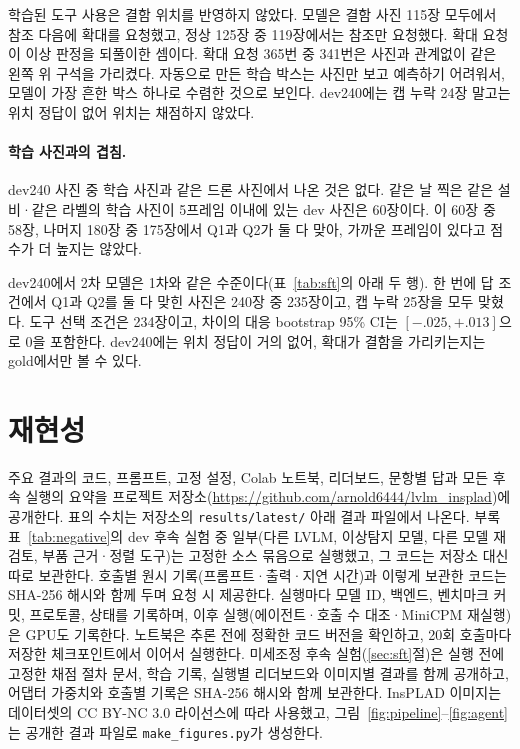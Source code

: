 \documentclass[11pt]{article}
\begin{document}
학습된 도구 사용은 결함 위치를 반영하지 않았다. 모델은 결함 사진 115장 모두에서 참조 다음에 확대를 요청했고, 정상 125장 중 119장에서는 참조만 요청했다. 확대 요청이 이상 판정을 되풀이한 셈이다. 확대 요청 365번 중 341번은 사진과 관계없이 같은 왼쪽 위 구석을 가리켰다. 자동으로 만든 학습 박스는 사진만 보고 예측하기 어려워서, 모델이 가장 흔한 박스 하나로 수렴한 것으로 보인다. dev240에는 캡 누락 24장 말고는 위치 정답이 없어 위치는 채점하지 않았다.

\paragraph{학습 사진과의 겹침.} dev240 사진 중 학습 사진과 같은 드론 사진에서 나온 것은 없다. 같은 날 찍은 같은 설비·같은 라벨의 학습 사진이 5프레임 이내에 있는 dev 사진은 60장이다. 이 60장 중 58장, 나머지 180장 중 175장에서 Q1과 Q2가 둘 다 맞아, 가까운 프레임이 있다고 점수가 더 높지는 않았다.

dev240에서 2차 모델은 1차와 같은 수준이다(표~\ref{tab:sft}의 아래 두 행). 한 번에 답 조건에서 Q1과 Q2를 둘 다 맞힌 사진은 240장 중 235장이고, 캡 누락 25장을 모두 맞혔다. 도구 선택 조건은 234장이고, 차이의 대응 bootstrap 95\% CI는 $[-.025,+.013]$으로 0을 포함한다. dev240에는 위치 정답이 거의 없어, 확대가 결함을 가리키는지는 gold에서만 볼 수 있다.

\section{재현성}
주요 결과의 코드, 프롬프트, 고정 설정, Colab 노트북, 리더보드, 문항별 답과 모든 후속 실행의 요약을 프로젝트 저장소(\url{https://github.com/arnold6444/lvlm_insplad})에 공개한다. 표의 수치는 저장소의 \texttt{results/latest/} 아래 결과 파일에서 나온다. 부록 표~\ref{tab:negative}의 dev 후속 실험 중 일부(다른 LVLM, 이상탐지 모델, 다른 모델 재검토, 부품 근거·정렬 도구)는 고정한 소스 묶음으로 실행했고, 그 코드는 저장소 대신 따로 보관한다. 호출별 원시 기록(프롬프트·출력·지연 시간)과 이렇게 보관한 코드는 SHA-256 해시와 함께 두며 요청 시 제공한다. 실행마다 모델 ID, 백엔드, 벤치마크 커밋, 프로토콜, 상태를 기록하며, 이후 실행(에이전트·호출 수 대조·MiniCPM 재실행)은 GPU도 기록한다. 노트북은 추론 전에 정확한 코드 버전을 확인하고, 20회 호출마다 저장한 체크포인트에서 이어서 실행한다. 미세조정 후속 실험(\ref{sec:sft}절)은 실행 전에 고정한 채점 절차 문서, 학습 기록, 실행별 리더보드와 이미지별 결과를 함께 공개하고, 어댑터 가중치와 호출별 기록은 SHA-256 해시와 함께 보관한다. InsPLAD 이미지는 데이터셋의 CC BY-NC 3.0 라이선스에 따라 사용했고, 그림~\ref{fig:pipeline}--\ref{fig:agent}는 공개한 결과 파일로 \texttt{make\_figures.py}가 생성한다.
\end{document}
